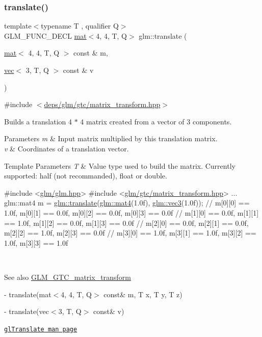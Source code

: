 \subsubsection{\texorpdfstring{translate()}{translate()}}
{\footnotesize\ttfamily template$<$typename T , qualifier Q$>$ \\
G\+L\+M\+\_\+\+F\+U\+N\+C\+\_\+\+D\+E\+CL \hyperlink{structglm_1_1mat}{mat}$<$4, 4, T, Q$>$ glm\+::translate (\begin{DoxyParamCaption}\item[{\hyperlink{structglm_1_1mat}{mat}$<$ 4, 4, T, Q $>$ const \&}]{m,  }\item[{\hyperlink{structglm_1_1vec}{vec}$<$ 3, T, Q $>$ const \&}]{v }\end{DoxyParamCaption})}



{\ttfamily \#include $<$\hyperlink{matrix__transform_8hpp}{deps/glm/gtc/matrix\+\_\+transform.\+hpp}$>$}

Builds a translation 4 $\ast$ 4 matrix created from a vector of 3 components.


\begin{DoxyParams}{Parameters}
{\em m} & Input matrix multiplied by this translation matrix. \\
\hline
{\em v} & Coordinates of a translation vector. \\
\hline
\end{DoxyParams}

\begin{DoxyTemplParams}{Template Parameters}
{\em T} & Value type used to build the matrix. Currently supported\+: half (not recommanded), float or double. 
\begin{DoxyCode}
\textcolor{preprocessor}{#include <\hyperlink{glm_8hpp}{glm/glm.hpp}>}
\textcolor{preprocessor}{#include <\hyperlink{matrix__transform_8hpp}{glm/gtc/matrix\_transform.hpp}>}
...
glm::mat4 m = \hyperlink{group__gtc__matrix__transform_ga1a4ecc4ad82652b8fb14dcb087879284}{glm::translate}(\hyperlink{structglm_1_1mat}{glm::mat4}(1.0f), \hyperlink{structglm_1_1vec}{glm::vec3}(1.0f));
\textcolor{comment}{// m[0][0] == 1.0f, m[0][1] == 0.0f, m[0][2] == 0.0f, m[0][3] == 0.0f}
\textcolor{comment}{// m[1][0] == 0.0f, m[1][1] == 1.0f, m[1][2] == 0.0f, m[1][3] == 0.0f}
\textcolor{comment}{// m[2][0] == 0.0f, m[2][1] == 0.0f, m[2][2] == 1.0f, m[2][3] == 0.0f}
\textcolor{comment}{// m[3][0] == 1.0f, m[3][1] == 1.0f, m[3][2] == 1.0f, m[3][3] == 1.0f}
\end{DoxyCode}
 \\
\hline
\end{DoxyTemplParams}
\begin{DoxySeeAlso}{See also}
\hyperlink{group__gtc__matrix__transform}{G\+L\+M\+\_\+\+G\+T\+C\+\_\+matrix\+\_\+transform} 

-\/ translate(mat$<$4, 4, T, Q$>$ const\& m, T x, T y, T z) 

-\/ translate(vec$<$3, T, Q$>$ const\& v) 

\href{https://www.khronos.org/registry/OpenGL-Refpages/gl2.1/xhtml/glTranslate.xml}{\tt gl\+Translate man page} 
\end{DoxySeeAlso}


